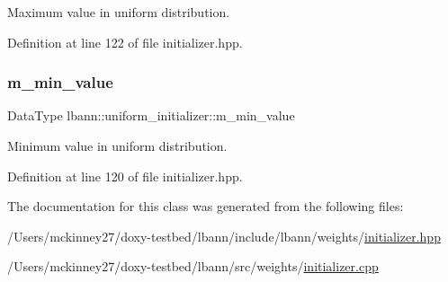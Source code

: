 Maximum value in uniform distribution. 

Definition at line 122 of file initializer.\+hpp.

\mbox{\label{classlbann_1_1uniform__initializer_aa8c380143e8804319b0ee2e277a4969c}} 
\subsubsection{\texorpdfstring{m\+\_\+min\+\_\+value}{m\_min\_value}}
{\footnotesize\ttfamily Data\+Type lbann\+::uniform\+\_\+initializer\+::m\+\_\+min\+\_\+value\hspace{0.3cm}{\ttfamily [private]}}

Minimum value in uniform distribution. 

Definition at line 120 of file initializer.\+hpp.



The documentation for this class was generated from the following files\+:\begin{DoxyCompactItemize}
\item 
/\+Users/mckinney27/doxy-\/testbed/lbann/include/lbann/weights/\hyperlink{initializer_8hpp}{initializer.\+hpp}\item 
/\+Users/mckinney27/doxy-\/testbed/lbann/src/weights/\hyperlink{initializer_8cpp}{initializer.\+cpp}\end{DoxyCompactItemize}
